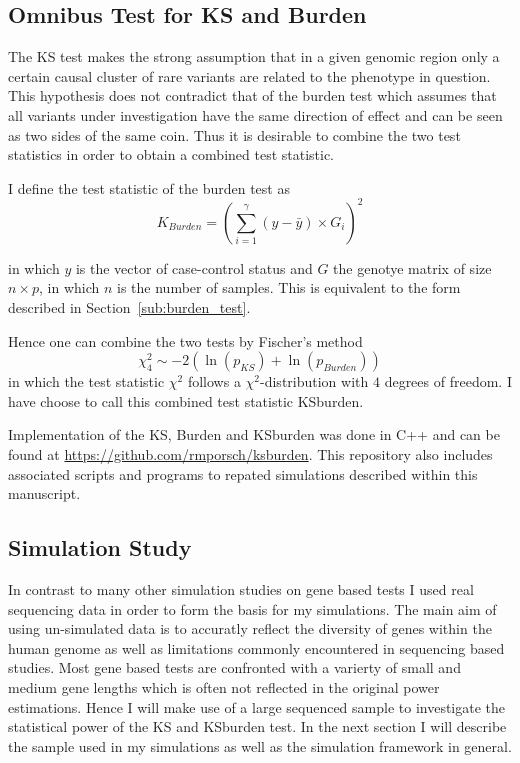 \subsection{Omnibus Test for KS and Burden}
\label{sub:omnibus_test_for_ks_and_burden}

The KS test makes the strong assumption that in a given genomic region only a certain causal cluster of rare variants are related to the phenotype in question.
This hypothesis does not contradict that of the burden test which assumes that all variants under investigation have the same direction of effect and can be seen as two sides of the same coin.
Thus it is desirable to combine the two test statistics in order to obtain a combined test statistic.

I define the test statistic of the burden test as 
\begin{equation}\label{eq:burden_simple}
  K_{Burden} = {(\sum^\gamma_{i=1} (y-\bar{y}) \times G_i)}^2
\end{equation}

in which $y$ is the vector of case-control status and $G$ the genotye matrix of size $n \times p$, in which $n$ is the number of samples.
This is equivalent to the form described in Section~\ref{sub:burden_test}.

Hence one can combine the two tests by Fischer's method 
\begin{equation}
	\chi^2_4 \sim - 2 (\ln(p_{KS}) + \ln(p_{Burden}))
\end{equation}
in which the test statistic $\chi^2$ follows a $\chi^2$-distribution with $4$ degrees of freedom.
I have choose to call this combined test statistic KSburden.

Implementation of the KS, Burden and KSburden was done in C++ and can be found at \url{https://github.com/rmporsch/ksburden}.
This repository also includes associated scripts and programs to repated simulations described within this manuscript.

\subsection{Simulation Study}
\label{sub:simulation_study}

In contrast to many other simulation studies on gene based tests I used real sequencing data in order to form the basis for my simulations.
The main aim of using un-simulated data is to accuratly reflect the diversity of genes within the human genome as well as limitations commonly encountered in sequencing based studies.
Most gene based tests are confronted with a varierty of small and medium gene lengths which is often not reflected in the original power estimations.
Hence I will make use of a large sequenced sample to investigate the statistical power of the KS and KSburden test.
In the next section I will describe the sample used in my simulations as well as the simulation framework in general.

